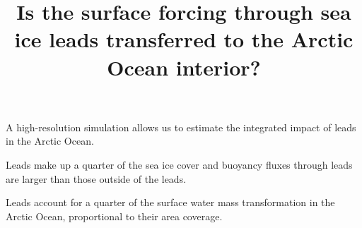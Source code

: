 \documentclass[draft]{agujournal2019}
\begin{document}
%
%


\title{Is the surface forcing through sea ice leads transferred to the Arctic Ocean interior?}

%
%









\begin{keypoints}
\item A high-resolution simulation allows us to estimate the integrated impact of leads in the Arctic Ocean.
\item Leads make up a quarter of the sea ice cover and buoyancy fluxes through leads are larger than those outside of the leads.
\item Leads account for a quarter of the surface water mass transformation in the Arctic Ocean, proportional to their area coverage.
\end{keypoints}
\end{document}

